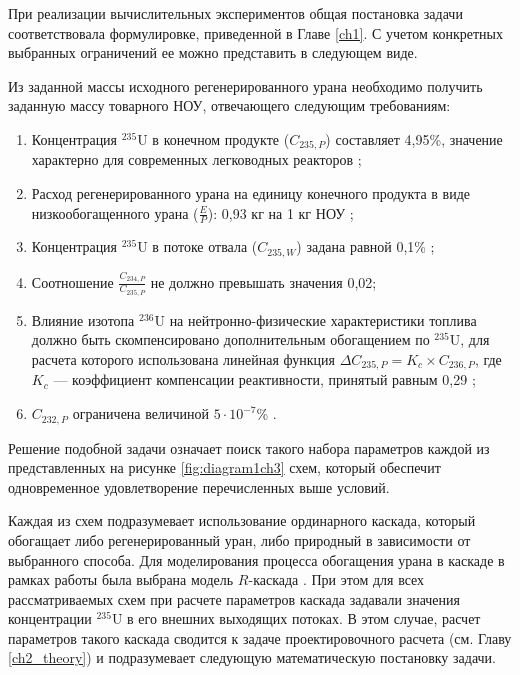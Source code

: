 При реализации вычислительных экспериментов общая постановка задачи соответствовала формулировке, приведенной в Главе \ref{ch1}. С учетом конкретных выбранных ограничений ее можно представить в следующем виде.

Из заданной массы исходного регенерированного урана необходимо получить заданную массу товарного НОУ, отвечающего следующим требованиям:

\begin{enumerate}
  \item Концентрация $^{235}$U в конечном продукте ($C_{235,P}$) составляет 4,95\%, значение характерно для современных легководных реакторов \cite{solovevaCennostiOYaTKak2019};
  \item Расход регенерированного урана на единицу конечного продукта в виде низкообогащенного урана ($\frac{E}{P}$): 0,93 кг на 1 кг НОУ \cite{smirnovApplyingEnrichmentCapacities2018};
  \item Концентрация $^{235}$U в потоке отвала ($C_{235,W}$) задана равной 0,1\% \cite{smirnovEvolutionIsotopicComposition2012};
  \item Соотношение $\frac{C_{234,P}}{C_{235,P}}$ не должно превышать значения 0,02;
  \item Влияние изотопа $^{236}$U на нейтронно-физические характеристики топлива должно быть скомпенсировано дополнительным обогащением по $^{235}$U, для расчета которого использована линейная функция $\Delta C_{235,P}=K_{c}\times C_{236,P}$, где $K_{c}$ --- коэффициент компенсации реактивности, принятый равным 0,29 \cite{smirnovApplyingEnrichmentCapacities2018};
  \item $C_{232,P}$ ограничена величиной $5\cdot10^{-7}$\% \cite{smirnovApplyingEnrichmentCapacities2018,smirnovAnalysisEffectRestrictions2021}.
\end{enumerate}

Решение подобной задачи означает поиск такого набора параметров каждой из представленных на рисунке \ref{fig:diagram1ch3} схем, который обеспечит одновременное удовлетворение перечисленных выше условий. 

Каждая из схем подразумевает использование ординарного каскада, который обогащает либо регенерированный уран, либо природный в зависимости от выбранного способа. Для моделирования процесса обогащения урана в каскаде в рамках работы была выбрана модель $R$-каскада \cite{sulaberidzeTeoriyaKaskadovDlya2011}. При этом для всех рассматриваемых схем при расчете параметров каскада задавали значения концентрации $^{235}$U в его внешних выходящих потоках. В этом случае, расчет параметров такого каскада сводится к задаче проектировочного расчета (см. Главу \ref{ch2_theory}) и подразумевает следующую математическую постановку задачи. 

